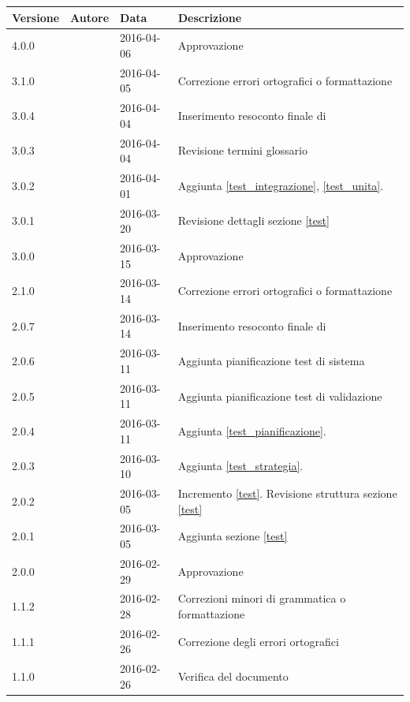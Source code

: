 \documentclass[12pt,a4paper]{article}
\begin{document}
\begin{center}
	\begin{longtable}[H]{p{} p{} p{} p{}}
		\toprule
		\textbf{Versione}	&	\textbf{Autore}	&	\textbf{Data}	&	\textbf{Descrizione}\\*
		\midrule
		\midrule
		4.0.0 & \TP & 2016-04-06 & Approvazione\\*
		\midrule
		3.1.0 & \NDC & 2016-04-05 & Correzione errori ortografici o formattazione \\*
  		\midrule
  		3.0.4 & \TP & 2016-04-04 & Inserimento resoconto finale di \FPD \\*
		\midrule
		3.0.3 & \TP & 2016-04-04 & Revisione termini glossario \\*
		\midrule
		3.0.2 & \TP & 2016-04-01 & Aggiunta \ref{test_integrazione}, \ref{test_unita}.\\*
		\midrule
		3.0.1 & \TP & 2016-03-20 & Revisione dettagli sezione \ref{test}\\*
		\midrule
		3.0.0 & \AB & 2016-03-15 & Approvazione\\*
		\midrule
		2.1.0 & \TP & 2016-03-14 & Correzione errori ortografici o formattazione \\*
 		\midrule
 		2.0.7 & \AB & 2016-03-14 & Inserimento resoconto finale di \FPA \\*
		\midrule
		2.0.6 & \AB & 2016-03-11 & Aggiunta pianificazione test di sistema\\*
		\midrule
		2.0.5 & \AB & 2016-03-11 & Aggiunta pianificazione test di validazione\\*
		\midrule
		2.0.4 & \AB & 2016-03-11 & Aggiunta \ref{test_pianificazione}.\\*
		\midrule
		2.0.3 & \AB & 2016-03-10 & Aggiunta \ref{test_strategia}.\\*
		\midrule
		2.0.2 & \AB & 2016-03-05 & Incremento \ref{test}. Revisione struttura sezione \ref{test} \\*
		\midrule
		2.0.1 & \AB & 2016-03-05 & Aggiunta sezione \ref{test} \\*
		\midrule
		2.0.0 & \AB & 2016-02-29 &  Approvazione\\*
		\midrule
		1.1.2 & \TP{} & 2016-02-28 & Correzioni minori di grammatica o formattazione \\*
		\midrule
		1.1.1 & \TP{} & 2016-02-26 & Correzione degli errori ortografici   \\*
		\midrule
		1.1.0 & \TP{} & 2016-02-26 & Verifica del documento \\*

\end{longtable}
\end{center}
\end{document}
